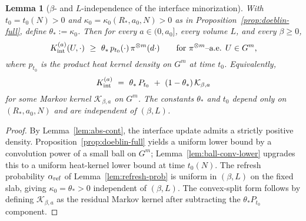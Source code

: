 \documentclass[11pt]{amsart}
\theoremstyle{plain}
\newtheorem{lemma}[theorem]{Lemma}
\theoremstyle{definition}
\theoremstyle{remark}
\begin{document}
\begin{lemma}[\boldmath$\beta$- and $L$-independence of the interface minorization]\label{lem:beta-L-independent-minorization}
With $t_0=t_0(N)>0$ and $\kappa_0=\kappa_0(R_*,a_0,N)>0$ as in Proposition~\ref{prop:doeblin-full}, define $\theta_*:=\kappa_0$. Then for every $a\in(0,a_0]$, every volume $L$, and every $\beta\ge 0$,
\[
  K_{\rm int}^{(a)}(U,\cdot)\ \ge\ \theta_*\, p_{t_0}(\cdot)\,\pi^{\otimes m}(d\cdot)\qquad\text{for $\pi^{\otimes m}$–a.e. $U\in G^m$,}
\]
where $p_{t_0}$ is the product heat kernel density on $G^m$ at time $t_0$. Equivalently,
\[
  K_{\rm int}^{(a)}\ =\ \theta_*\,P_{t_0}\ +\ (1-\theta_*)\,\mathcal K_{\beta,a}
\]
for some Markov kernel $\mathcal K_{\beta,a}$ on $G^m$. The constants $\theta_*$ and $t_0$ depend only on $(R_*,a_0,N)$ and are independent of $(\beta,L)$.
\end{lemma}

\begin{proof}
By Lemma~\ref{lem:abs-cont}, the interface update admits a strictly positive density. Proposition~\ref{prop:doeblin-full} yields a uniform lower bound by a convolution power of a small ball on $G^m$; Lemma~\ref{lem:ball-conv-lower} upgrades this to a uniform heat-kernel lower bound at time $t_0(N)$. The refresh probability $\alpha_{\rm ref}$ of Lemma~\ref{lem:refresh-prob} is uniform in $(\beta,L)$ on the fixed slab, giving $\kappa_0=\theta_*>0$ independent of $(\beta,L)$. The convex-split form follows by defining $\mathcal K_{\beta,a}$ as the residual Markov kernel after subtracting the $\theta_* P_{t_0}$ component.
\end{proof}
\end{document}

